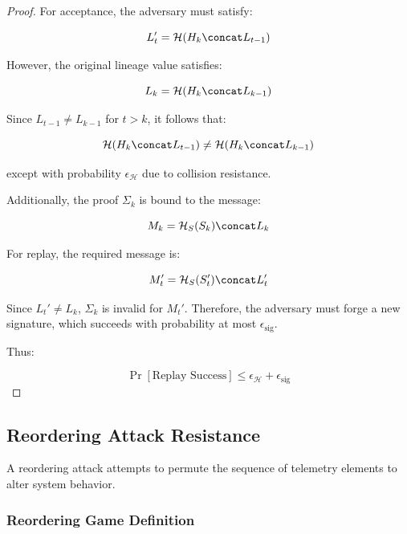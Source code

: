 \begin{proof}
For acceptance, the adversary must satisfy:

\begin{equation}
L_t' = \mathcal{H}(H_k \concat L_{t-1})
\end{equation}

However, the original lineage value satisfies:

\begin{equation}
L_k = \mathcal{H}(H_k \concat L_{k-1})
\end{equation}

Since $L_{t-1} \neq L_{k-1}$ for $t > k$, it follows that:

\begin{equation}
\mathcal{H}(H_k \concat L_{t-1}) \neq \mathcal{H}(H_k \concat L_{k-1})
\end{equation}

except with probability $\epsilon_{\mathcal{H}}$ due to collision resistance.

Additionally, the proof $\Sigma_k$ is bound to the message:

\begin{equation}
M_k = \mathcal{H}_S(S_k) \concat L_k
\end{equation}

For replay, the required message is:

\begin{equation}
M_t' = \mathcal{H}_S(S_t') \concat L_t'
\end{equation}

Since $L_t' \neq L_k$, $\Sigma_k$ is invalid for $M_t'$. Therefore, the adversary must forge a new signature, which succeeds with probability at most $\epsilon_{\text{sig}}$.

Thus:

\[
\Pr[\text{Replay Success}] \leq \epsilon_{\mathcal{H}} + \epsilon_{\text{sig}}
\]
\end{proof}

\subsection{Reordering Attack Resistance}

A reordering attack attempts to permute the sequence of telemetry elements to alter system behavior.

\subsubsection{Reordering Game Definition}

